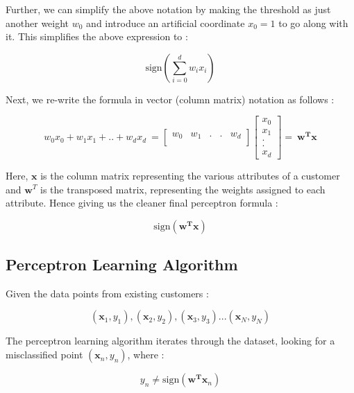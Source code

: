 \documentclass[12pt, letterpaper]{article}
\begin{document}
Further, we can simplify the above notation by making the threshold as just another weight $w_0$ and introduce an artificial coordinate $x_0 = 1$ to go along with it. This simplifies the above expression to : 

\begin{displaymath}
    \text{sign} \left( \sum_{i = 0}^{d} w_ix_i \right)
\end{displaymath}

Next, we re-write the formula in vector (column matrix) notation as follows : 

\begin{displaymath}
w_0x_0 + w_1x_1 + .. + w_dx_d \ = \begin{bmatrix}
w_0 & w_1 & . & . & w_d\\
\end{bmatrix}
\begin{bmatrix}
x_0 \\
x_1 \\
. \\
. \\
x_d
\end{bmatrix} = \ \mathbf{w^T x}
\end{displaymath}

Here, $\mathbf{x}$ is the column matrix representing the various attributes of a customer and $\mathbf{w}^T$ is the transposed matrix, representing the weights assigned to each attribute. Hence giving us the cleaner final perceptron formula : 

\begin{displaymath}
    \text{sign}(\mathbf{w^T x})
\end{displaymath}

\subsection{Perceptron Learning Algorithm}
 Given the data points from existing customers : 

 \begin{displaymath}
     (\mathbf{x}_1,y_1), (\mathbf{x}_2,y_2), (\mathbf{x}_3,y_3)...(\mathbf{x}_N, y_N)
 \end{displaymath}

The perceptron learning algorithm iterates through the dataset, looking for a misclassified point $(\mathbf{x}_n, y_n)$, where : 

\begin{displaymath}
    y_n \neq \text{sign}(\mathbf{w^T}\mathbf{x}_n)
\end{displaymath}
\end{document}

